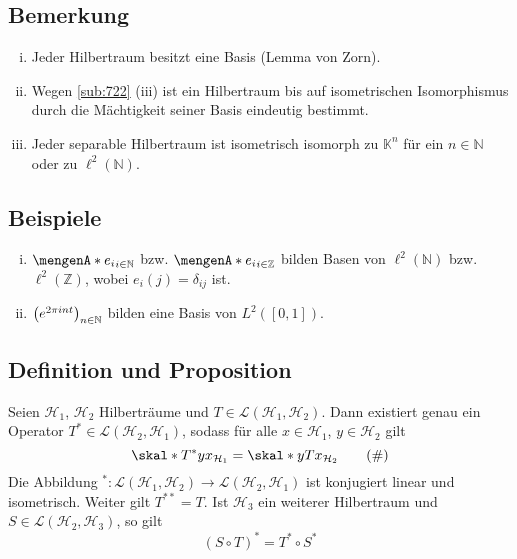 \subsection{Bemerkung} %
\label{sub:723}
\begin{enumerate}[(i)]
	\item Jeder Hilbertraum besitzt eine Basis (Lemma von Zorn).
	\item Wegen \ref{sub:722} (iii) ist ein Hilbertraum bis auf isometrischen Isomorphismus durch die Mächtigkeit seiner Basis eindeutig bestimmt.
	\item Jeder separable Hilbertraum ist isometrisch isomorph zu $\mathds{K}^n$ für ein $n \in \mathds{N}$ oder zu $\ell^2(\mathds{N})$.
\end{enumerate}

\subsection[Beispiele für Basen von Hilberträumen]{Beispiele} %
\label{sub:724}
\begin{enumerate}[(i)]
	\item $\set{e_i}_{i \in \mathds{N}}$ bzw. $\set{e_i}_{i \in \mathds{Z}}$ bilden Basen von $\ell^2(\mathds{N})$ bzw. $\ell^2(\mathds{Z})$, wobei 
	$e_i(j)= \delta_{ij}$ ist.
	\item $\enbrace*{e^{2 \pi i n t}}_{n \in \mathds{N}}$ bilden eine Basis von $L^2([0,1])$.
\end{enumerate}

\subsection{Definition und Proposition} %
\label{sub:725}
Seien $\mathcal{H}_1$, $\mathcal{H}_2$ Hilberträume und $T \in \mathcal{L}(\mathcal{H}_1, \mathcal{H_2})$. Dann existiert genau ein Operator 
$T^* \in \mathcal{L}(\mathcal{H}_2, \mathcal{H}_1)$, sodass für alle $x \in \mathcal{H}_1$, $y \in \mathcal{H}_2$ gilt 
\begin{equation*}
	\skal*{T^* y}{x}_{\mathcal{H}_1} = \skal*{y}{T x}_{\mathcal{H}_2} \label{eq:725} \tag{\#}
\end{equation*}
Die Abbildung ${ }^*  \colon \mathcal{L}(\mathcal{H}_1, \mathcal{H}_2) \to \mathcal{L}(\mathcal{H}_2, \mathcal{H}_1)$ ist konjugiert linear und isometrisch. Weiter gilt
$T^{**} = T$. Ist $\mathcal{H}_3$ ein weiterer Hilbertraum und $S \in \mathcal{L}(\mathcal{H}_2, \mathcal{H}_3)$, so gilt
\[
	(S \circ T)^* = T^* \circ S^*
\]


